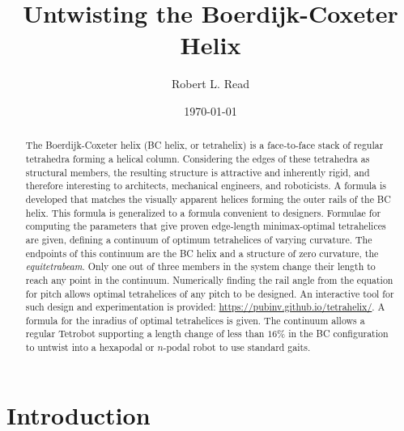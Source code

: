 \documentclass[twocolumn,10pt]{asme2ej}
\title{Untwisting the Boerdijk-Coxeter Helix}
\author{Robert L. Read
  \affiliation{
    Founder, Public Invention \\
    Austin, TX, 78704 \\
    Email: \href{mailto:read.robert@gmail.com}{read.robert@gmail.com} 
    }
}
\date{\today}
\begin{document}
\maketitle



\begin{abstract}
  The Boerdijk-Coxeter helix (BC helix, or tetrahelix) is a
  face-to-face stack of regular tetrahedra forming a helical column.  Considering the edges of
  these tetrahedra as structural members, the resulting structure is attractive and
  inherently rigid, and therefore interesting to architects,
  mechanical engineers, and roboticists.  A formula is developed that matches the
  visually apparent helices forming the outer rails of the BC helix.
  This formula is generalized to a formula convenient to designers.
  Formulae for 
  computing the
  parameters that give proven edge-length minimax-optimal tetrahelices
  are given, defining a continuum of optimum tetrahelices of varying curvature.
  The endpoints of this continuum are the BC helix and
  a structure of zero curvature, the \emph{equitetrabeam}.
  Only one out of three members in the system change their length to reach
  any point in the continuum.
  Numerically finding the rail angle from the equation for
  pitch allows optimal tetrahelices of any pitch to be designed. 
  An interactive tool for such design and experimentation is provided: \url{https://pubinv.github.io/tetrahelix/}.
  A formula for the inradius of optimal tetrahelices is given.
  The continuum allows a regular Tetrobot supporting a length change of less than $16\%$ in the
  BC configuration to untwist into a hexapodal or $n$-podal robot
  to use standard gaits.
\end{abstract}






\section{Introduction}
\end{document}
